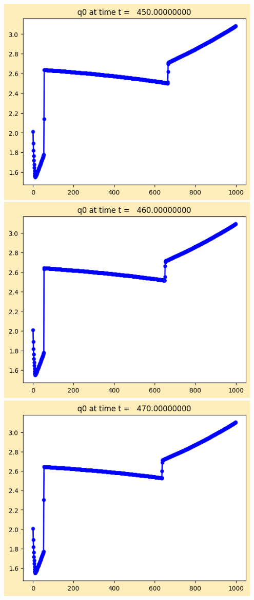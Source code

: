 \documentclass[11pt]{article}
\begin{document}
\vskip 10pt 
\includegraphics[width=0.95\textwidth]{frame0045fig1.png}
\vskip 10pt 
\includegraphics[width=0.95\textwidth]{frame0046fig1.png}
\vskip 10pt 
\includegraphics[width=0.95\textwidth]{frame0047fig1.png}
\end{document}

